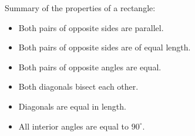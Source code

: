 

Summary of the properties of a rectangle:\par 
\begin{itemize}[noitemsep]
\item Both pairs of opposite sides are parallel.
\item Both pairs of opposite sides are of equal length.
\item Both pairs of opposite angles are equal.
\item Both diagonals bisect each other.
\item Diagonals are equal in length.
\item All interior angles are equal to $90^{\circ}$.
\end{itemize}

